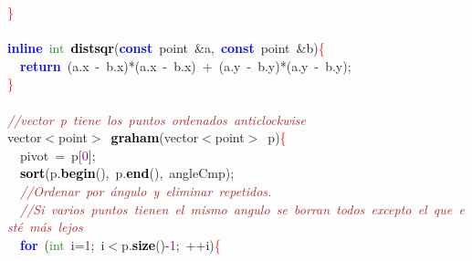 \documentclass[10pt,a4paper,twoside]{article}
\begin{document}
{{{{{{{{{{\mbox{}\textcolor{Red}{\}} \\
\mbox{} \\
\mbox{}\textbf{\textcolor{Blue}{inline}}\ \textcolor{ForestGreen}{int}\ \textbf{\textcolor{Black}{distsqr}}\textcolor{BrickRed}{(}\textbf{\textcolor{Blue}{const}}\ point\ \textcolor{BrickRed}{\&}a\textcolor{BrickRed}{,}\ \textbf{\textcolor{Blue}{const}}\ point\ \textcolor{BrickRed}{\&}b\textcolor{BrickRed}{)}\textcolor{Red}{\{} \\
\mbox{}\ \ \textbf{\textcolor{Blue}{return}}\ \textcolor{BrickRed}{(}a\textcolor{BrickRed}{.}x\ \textcolor{BrickRed}{-}\ b\textcolor{BrickRed}{.}x\textcolor{BrickRed}{)*(}a\textcolor{BrickRed}{.}x\ \textcolor{BrickRed}{-}\ b\textcolor{BrickRed}{.}x\textcolor{BrickRed}{)}\ \textcolor{BrickRed}{+}\ \textcolor{BrickRed}{(}a\textcolor{BrickRed}{.}y\ \textcolor{BrickRed}{-}\ b\textcolor{BrickRed}{.}y\textcolor{BrickRed}{)*(}a\textcolor{BrickRed}{.}y\ \textcolor{BrickRed}{-}\ b\textcolor{BrickRed}{.}y\textcolor{BrickRed}{);} \\
\mbox{}\textcolor{Red}{\}} \\
\mbox{} \\
\mbox{}\textit{\textcolor{Brown}{//vector\ p\ tiene\ los\ puntos\ ordenados\ anticlockwise}} \\
\mbox{}vector\textcolor{BrickRed}{$<$}point\textcolor{BrickRed}{$>$}\ \textbf{\textcolor{Black}{graham}}\textcolor{BrickRed}{(}vector\textcolor{BrickRed}{$<$}point\textcolor{BrickRed}{$>$}\ p\textcolor{BrickRed}{)}\textcolor{Red}{\{} \\
\mbox{}\ \ pivot\ \textcolor{BrickRed}{=}\ p\textcolor{BrickRed}{[}\textcolor{Purple}{0}\textcolor{BrickRed}{];} \\
\mbox{}\ \ \textbf{\textcolor{Black}{sort}}\textcolor{BrickRed}{(}p\textcolor{BrickRed}{.}\textbf{\textcolor{Black}{begin}}\textcolor{BrickRed}{(),}\ p\textcolor{BrickRed}{.}\textbf{\textcolor{Black}{end}}\textcolor{BrickRed}{(),}\ angleCmp\textcolor{BrickRed}{);} \\
\mbox{}\ \ \textit{\textcolor{Brown}{//Ordenar\ por\ ángulo\ y\ eliminar\ repetidos.}} \\
\mbox{}\ \ \textit{\textcolor{Brown}{//Si\ varios\ puntos\ tienen\ el\ mismo\ angulo\ se\ borran\ todos\ excepto\ el\ que\ esté\ más\ lejos}} \\
\mbox{}\ \ \textbf{\textcolor{Blue}{for}}\ \textcolor{BrickRed}{(}\textcolor{ForestGreen}{int}\ i\textcolor{BrickRed}{=}\textcolor{Purple}{1}\textcolor{BrickRed}{;}\ i\textcolor{BrickRed}{$<$}p\textcolor{BrickRed}{.}\textbf{\textcolor{Black}{size}}\textcolor{BrickRed}{()-}\textcolor{Purple}{1}\textcolor{BrickRed}{;}\ \textcolor{BrickRed}{++}i\textcolor{BrickRed}{)}\textcolor{Red}{\{}\ \ \ \  \\
}}}}}}}}}}
\end{document}
